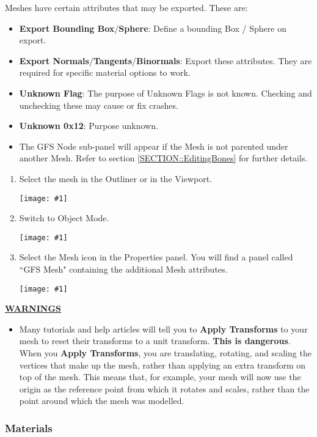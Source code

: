 \documentclass{article}
\newenvironment{guide}[1]
{
	\begin{center}
		\begin{tcolorbox}[%
			colback=black!20, 
			boxrule=0pt, 
			title=Step-by-step: #1,
			enhanced,
			breakable,
			overlay unbroken={%
                \draw[line width=1pt, black, rounded corners]
        	    (frame.north west) rectangle (frame.south east);
			},
    		overlay first={%
        		 \draw[line width=1pt, black, rounded corners]
        	    (frame.south west) -- (frame.north west) -- (frame.north east) -- (frame.south east);
                \draw[line width=1pt, black]
                (frame.south west) -- (frame.south east);
            },
    		overlay middle={%
                \draw[line width=1pt, black]
        	    (frame.north west) rectangle (frame.south east);
        	},
    		overlay last={%
                \draw[line width=1pt, black, rounded corners]
        	    (frame.north west) -- (frame.south west) -- (frame.south east) -- (frame.north east);
                \draw[line width=1pt, black]
                (frame.north west) -- (frame.north east);
           	}
        ]{}
    	\begin{enumerate}
}
{
    		\end{enumerate}
    	\end{tcolorbox}
	\end{center}  	 
}
\newcommand{\guideimage}[1]
{
	\begin{center}
		\texttt{[image: \#1]}
	\end{center}
}
\begin{document}
Meshes have certain attributes that may be exported. These are:
\begin{itemize}
\item \textbf{Export Bounding Box}/\textbf{Sphere}: Define a bounding Box / Sphere on export.
\item \textbf{Export Normals}/\textbf{Tangents}/\textbf{Binormals}: Export these attributes. They are required for specific material options to work.
\item \textbf{Unknown Flag}: The purpose of Unknown Flags is not known. Checking and unchecking these may cause or fix crashes.
\item \textbf{Unknown 0x12}: Purpose unknown.
\item The GFS Node sub-panel will appear if the Mesh is not parented under another Mesh. Refer to section \ref{SECTION::EditingBones} for further details.
\end{itemize}

\begin{guide}{Accessing Extra Mesh Attributes}
\item Select the mesh in the Outliner or in the Viewport.
\guideimage{images/editing_models/edits_select_mesh.png}
\item Switch to Object Mode.
\guideimage{images/editing_models/edits_to_object_mode.png}
\item Select the Mesh icon in the Properties panel. You will find a panel called ``GFS Mesh" containing the additional Mesh attributes.
\guideimage{images/editing_models/edits_mesh_properties.png}
\end{guide}

\underline{\textbf{WARNINGS}}
\begin{itemize}
\item Many tutorials and help articles will tell you to \textbf{Apply Transforms} to your mesh to reset their transforms to a unit transform. \textbf{This is dangerous}. When you \textbf{Apply Transforms}, you are translating, rotating, and scaling the vertices that make up the mesh, rather than applying an extra transform on top of the mesh. This means that, for example, your mesh will now use the origin as the reference point from which it rotates and scales, rather than the point around which the mesh was modelled.
\end{itemize}

\subsubsection{Materials}
\label{SECTION::EditingMaterials}
\end{document}
